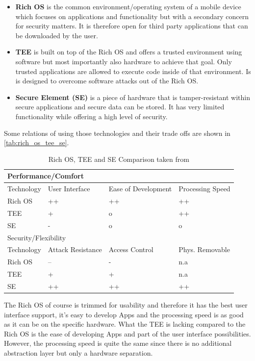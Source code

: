 \begin{itemize}
\item \textbf{Rich OS} is the common environment/operating system of a mobile device which focuses on applications and functionality but with a secondary concern for security matters. It is therefore open for third party applications
that can be downloaded by the user.
\item \textbf{TEE} is built on top of the Rich OS and offers a trusted environment using software but most importantly also hardware to achieve that goal. Only trusted applications are allowed to execute code inside of that environment. Is is designed to overcome software attacks out of the Rich OS.
\item \textbf{Secure Element (SE)} is a piece of hardware that is tamper-resistant within secure applications and secure data can be stored. It has very limited functionality while offering a high level of security.
\end{itemize}
Some relations of using those technologies and their trade offs are shown in \autoref{tab:rich_os_tee_se}.
\begin{table}[htb]
  \caption[Rich OS, TEE and SE Comparison]{Rich OS, TEE and SE Comparison taken from \parencite{tee_guide}}
  \label{tab:rich_os_tee_se}
  \begin{tabular}{l l l l}
  \toprule
  \multicolumn{4}{l}{Performance/Comfort}\\
  \midrule
  Technology & User Interface & Ease of Development & Processing Speed \\
  \midrule
  Rich OS & ++ & ++ & ++ \\
  TEE     & +  & o  & ++ \\
  SE      & -  & o  & o  \\
  \bottomrule
  \multicolumn{4}{l}{Security/Flexibility}\\
  \midrule
  Technology & Attack Resistance & Access Control & Phys. Removable \\
  \midrule
  Rich OS & -- & - & n.a\\
  TEE & + & + & n.a \\
  SE & ++ & ++ & ++ \\
  \bottomrule
  \end{tabular}
\end{table}
The Rich OS of course is trimmed for usability and therefore it has the best
user interface support, it's easy to develop Apps and the processing speed is as good as it can be on the specific hardware. What the TEE is lacking compared to the Rich OS is the ease of developing Apps and part of the user interface possibilities. However, the processing speed is quite the same since there is no additional abstraction layer but only a hardware separation.
